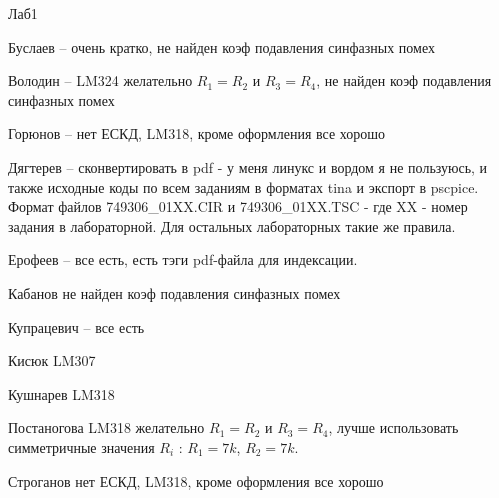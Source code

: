 \documentclass[a4paper,11pt]{article}
\begin{document}
\newpage
Лаб1 

Буслаев  -- очень кратко, не найден коэф подавления синфазных помех

Володин -- LM324  желательно $R_1=R_2$ и $R_3=R_4$, не найден коэф подавления синфазных помех

Горюнов  -- нет ЕСКД, LM318, кроме оформления все хорошо

Дягтерев -- сконвертировать в pdf - у меня линукс и вордом я не пользуюсь, и также исходные коды по всем заданиям в форматах tina и экспорт в pscpice. Формат файлов 749306\_01XX.CIR 
и 749306\_01XX.TSC - где XX - номер задания в лабораторной. Для остальных лабораторных такие же правила. 

Ерофеев -- все есть, есть тэги pdf-файла для индексации.

Кабанов  не найден коэф подавления синфазных помех

Купрацевич -- все есть

Кисюк LM307

Кушнарев LM318

Постаногова LM318 желательно $R_1=R_2$ и $R_3=R_4$, лучше использовать симметричные значения $R_i$ : $R_1=7k$, $R_2=7k$. 

Строганов нет ЕСКД, LM318, кроме оформления все хорошо
\end{document}
